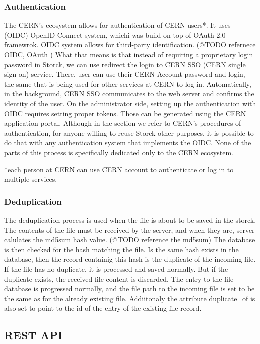 \subsubsection{Authentication}
The CERN's ecosystem allows for authentication of CERN users*. It uses (OIDC) OpenID Connect system, whichi was build on top of OAuth 2.0 framewrok.
OIDC system allows for third-party identification.
(@TODO refernece OIDC, OAuth )
What that means is that instead of requiring a proprietary login password in Storck, we can use redirect the login to CERN SSO (CERN single sign on) service.
There, user can use their CERN Account password and login, the same that is being used for other services at CERN to log in.
Automatically, in the background, CERN SSO communicates to the web server and confirms the identity of the user.
On the administrator side, setting up the authentication with OIDC requires setting proper tokens. Those can be generated using the CERN application portal.
Although in the section we refer to CERN's procedures of authentication, for anyone willing to reuse Storck other purposes, it is possible to do that with any authentication system that implements the OIDC.
None of the parts of this process is specifically dedicated only to the CERN ecosystem.

*each person at CERN can use CERN account to authenticate or log in to multiple services.

\subsubsection{Deduplication}
\label{sec:deduplication}

The deduplication process is used when the file is about to be saved in the storck.
The contents of the file must be received by the server, and when they are, server calulates the md5sum hash value.
(@TODO reference the md5sum)
The database is then checked for the hash matching the file.
Is the same hash exists in the database, then the record containig this hash is the duplicate of the incoming file.
If the file has no duplicate, it is processed and saved normally.
But if the duplicate exists, the received file content is discarded.
The entry to the file database is progressed normally, and the file path to the incoming file is set to be the same as for the already existing file.
Addiitonaly the attribute duplicate\_of is also set to point to the id of the entry of the existing file record.

\subsection{REST API}

